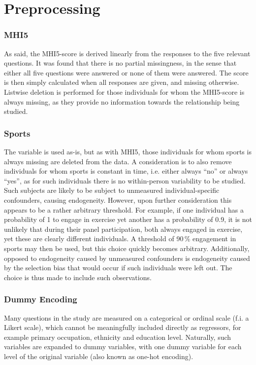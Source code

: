 \section{Preprocessing}
\label{sec:data:preprocessing}
\subsubsection{MHI5}
As said, the MHI5-score is derived linearly from the responses to the five relevant questions. It was found that
there is no partial missingness, in the sense that either all five questions were answered or none of them were answered.
The score is then simply calculated when all responses are given, and missing otherwise.
Listwise deletion is performed for those individuals for whom the MHI5-score is always missing, as they provide no
information towards the relationship being studied.

\subsubsection{Sports}
The variable is used as-is, but as with MHI5, those individuals for whom sports is always missing are deleted from the data.
A consideration is to also remove individuals for whom sports is constant in time, i.e. either always ``no'' or always ``yes'',
as for such individuals there is no within-person variability to be studied. Such subjects are likely to be subject
to unmeasured individual-specific confounders, causing endogeneity.
However, upon further consideration this appears to be a rather arbitrary threshold. For example, if one individual has a
probability of 1 to engage in exercise yet another has a probability of 0.9, it is not unlikely that during their
panel participation, both always engaged in exercise, yet these are clearly different individuals.
A threshold of 90\,\% engagement in sports may then be used, but this choice quickly becomes arbitrary.
Additionally, opposed to endogeneity caused by unmeasured confounders is endogeneity caused by the selection bias
that would occur if such individuals were left out.
The choice is thus made to include such observations.

\subsubsection{Dummy Encoding}
Many questions in the study are measured on a categorical or ordinal scale (f.i. a Likert scale), which cannot be
meaningfully included directly as regressors, for example primary occupation, ethnicity and education level.
Naturally, such variables are expanded to dummy variables, with one dummy variable for each level of the original variable
(also known as one-hot encoding).

